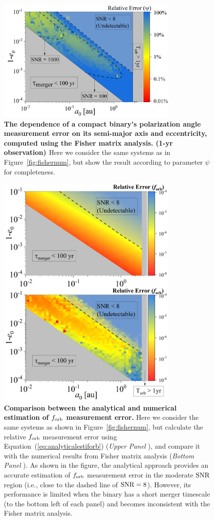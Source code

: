 \documentclass[%
 reprint,
 amsmath,amssymb,
 aps,
]{revtex4-2}
\begin{document}
\begin{figure}[t]
    \centering
    \includegraphics[width=3.5in]{Fisher_psi.png} 
    \caption{{\bf{The dependence of a compact binary's polarization angle measurement error on its semi-major axis and eccentricity, computed using the Fisher matrix analysis. (1-yr observation) }} Here we consider the same systems as in Figure~\ref{fig:fishernum}, but show the result according to parameter $\psi$ for completeness.
    }
    \label{fig:gcbkgeg}
\end{figure}

\begin{figure}[t]
    \centering
    \includegraphics[width=3.5in]{fisherana.png} 
    \caption{{\bf Comparison between the analytical and numerical estimation of $f_{\rm orb}$ measurement error.} Here we consider the same systems as shown in Figure~\ref{fig:fishernum}, but calculate the relative $f_{\rm orb}$ measurement error using Equation~(\ref{eq:analyticalestiforb}) ({\it Upper Panel} ), and compare it with the numerical results from Fisher matrix analysis ({\it Bottom Panel} ). As shown in the figure, the analytical approach provides an accurate estimation of $f_{\rm orb}$ measurement error in the moderate $\rm SNR$ region (i.e., close to the dashed line of $\rm SNR=8$). However, its performance is limited when the binary has a short merger timescale (to the bottom left of each panel) and becomes inconsistent with the Fisher matrix analysis.
    }
    \label{fig:fisherana}
\end{figure}
\end{document}
